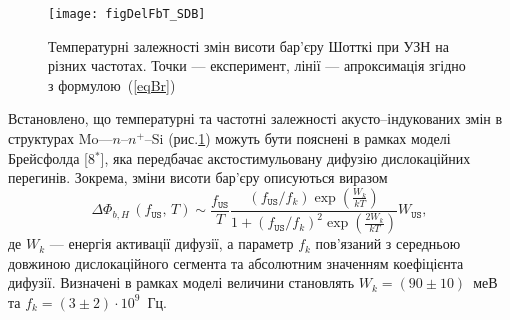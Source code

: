 \begin{figure}[b]
\center
\texttt{[image: figDelFbT\_SDB]}
\caption{\label{figDelFbT_SDB}
Температурні залежності змін висоти бар'єру Шотткі при УЗН на різних частотах.
Точки --- експеримент,
лінії --- апроксимація згідно з формулою~(\ref{eqBr})
}%
\end{figure}
Встановлено, що температурні та частотні залежності акусто--індукованих змін в структурах
 Mo---$n$--$n^+$--Si (рис.\ref{figDelFbT_SDB}) можуть бути пояснені в рамках моделі Брейсфолда
[8$^*$],
яка передбачає акстостимульовану дифузію дислокаційних перегинів.
Зокрема, зміни висоти бар'єру описуються виразом
\begin{equation}
\label{eqBr}
\Delta\Phi_{b,H}\,(f_\mathtt{US},\,T)\sim\frac{f_\mathtt{US}}{T}\frac{(f_\mathtt{US}/{f_k})\exp\left(\frac{W_k}{kT}\right)}
{1+(f_\mathtt{US}/{f_k})^2\exp\left(\frac{2W_k}{kT}\right)}W_\mathtt{US},
\end{equation}
де
$W_k$ --- енергія активації дифузії,
а параметр $f_k$ пов'язаний з середньою довжиною дислокаційного сегмента та абсолютним значенням коефіцієнта дифузії.
Визначені в рамках моделі величини становлять $W_k=(90\pm10)$~меВ та $f_k=(3\pm2)\cdot10^9$~Гц.


